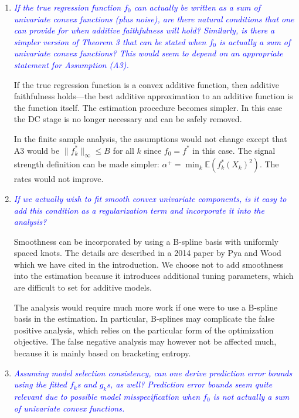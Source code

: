 \documentclass[pdftex,12pt]{article}
\def\rc#1{{\it\textcolor{blue}{#1}}\smallskip}
\begin{document}
\begin{enumerate}[(1)]
\item \rc{If the true regression function $f_0$ can actually be written as a
sum of univariate convex functions (plus noise), are there natural
conditions that one can provide for when additive faithfulness will
hold? Similarly, is there a simpler version of Theorem 3 that can be
stated when $f_0$ is actually a sum of univariate convex functions? This
would seem to depend on an appropriate statement for Assumption (A3).}

If the true regression function is a convex additive function, then
additive faithfulness holds---the best additive approximation
to an additive function is the function itself. The estimation
procedure becomes simpler.  In this case the DC stage is no longer necessary and can
be safely removed.

In the finite sample analysis, the assumptions would not change except that A3 would be $\| f^*_k \|_\infty \leq B$ for all $k$ since $f_0 = f^*$ in this case. The signal strength definition can be made simpler: $\alpha^+ = \min_k \mathbb{E}( f^*_k(X_k)^2 )$. The rates would not improve.


\item \rc{If we actually wish to fit smooth convex univariate components, is
it easy to add this condition as a regularization term and incorporate
it into the analysis?}

Smoothness can be incorporated by using a B-spline basis with uniformly
spaced knots. The details are described in a 2014 paper by Pya and
Wood which we have cited in the introduction. We choose not to add
smoothness into the estimation because it introduces 
additional tuning parameters, which are difficult to set for
additive models.

The analysis would require much more work if one were to use a B-spline basis
in the estimation. In particular, B-splines may complicate the false positive
analysis, which relies on the particular form of the optimization
objective. The false negative analysis may however not be affected much,
because it is mainly based on bracketing entropy.

\item \rc{Assuming model selection consistency, can one derive prediction
error bounds using the fitted $f_k$s and $g_k$s, as well? Prediction error
bounds seem quite relevant due to possible model misspecification when
$f_0$ is not actually a sum of univariate convex functions.}


\end{enumerate}
\end{document}
